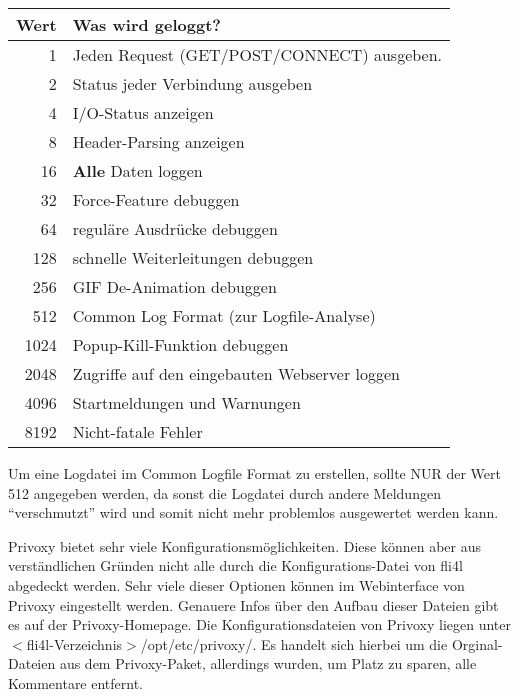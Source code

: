 \begin{description}
{        \begin{tabular}[h!]{rl}

    Wert & Was wird geloggt? \\
    \hline
    1    & Jeden Request (GET/POST/CONNECT) ausgeben. \\
    2    & Status jeder Verbindung ausgeben \\
    4    & I/O-Status anzeigen \\
    8    & Header-Parsing anzeigen \\
    16   & \textbf{Alle} Daten loggen \\
    32   & Force-Feature debuggen \\
    64   & reguläre Ausdrücke debuggen \\
    128  & schnelle Weiterleitungen debuggen \\
    256  & GIF De-Animation debuggen \\
    512  & Common Log Format (zur Logfile-Analyse) \\
    1024 & Popup-Kill-Funktion debuggen \\
    2048 & Zugriffe auf den eingebauten Webserver loggen \\
    4096 & Startmeldungen und Warnungen \\
    8192 & Nicht-fatale Fehler \\
        \end{tabular}

        Um eine Logdatei im Common Logfile Format zu erstellen, sollte
        NUR der Wert 512 angegeben werden, da sonst die Logdatei durch
        andere Meldungen ``verschmutzt'' wird und somit nicht mehr
        problemlos ausgewertet werden kann.}

\end{description}

        Privoxy bietet sehr viele Konfigurationsmöglichkeiten. Diese
        können aber aus verständlichen Gründen nicht alle durch die
        Konfigurations-Datei von fli4l abgedeckt werden. Sehr viele
        dieser Optionen können im Webinterface von Privoxy eingestellt
        werden. Genauere Infos über den Aufbau dieser Dateien gibt es
        auf der Privoxy-Homepage. Die Konfigurationsdateien von
        Privoxy liegen unter
        $<$fli4l-Verzeichnis$>$/opt/etc/privoxy/. Es handelt sich
        hierbei um die Orginal-Dateien aus dem Privoxy-Paket,
        allerdings wurden, um Platz zu sparen, alle Kommentare
        entfernt.
